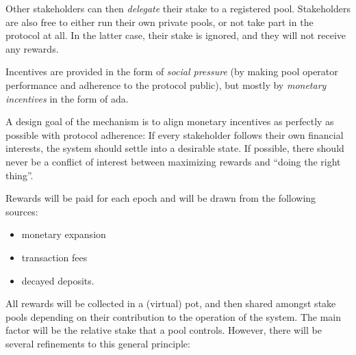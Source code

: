 \documentclass[11pt,a4paper,dvipsnames,twosided]{article}
\begin{document}
Other stakeholders can then \emph{delegate} their stake to a registered
pool.  Stakeholders are also free to either run their own private
pools, or not take part in the protocol at all. In the latter case,
their stake is ignored, and they will not receive any rewards.

Incentives are provided in the form of \emph{social pressure} (by making
pool operator performance and adherence to the protocol public), but
mostly by \emph{monetary incentives} in the form of ada.

A design goal of the mechanism is to align monetary incentives as
perfectly as possible with protocol adherence: If every stakeholder
follows their own financial interests, the system should settle into a
desirable state. If possible, there should never be a conflict of
interest between maximizing rewards and ``doing the right thing''.

Rewards will be paid for each epoch and will be drawn from the following
sources:

\begin{itemize}
\item
  monetary expansion
\item
  transaction fees
\item
  decayed deposits.
\end{itemize}

All rewards will be collected in a (virtual) pot, and then shared amongst stake
pools depending on their contribution to the operation of the system. The main
factor will be the relative stake that a pool controls. However, there will be
several refinements to this general principle:
\end{document}
